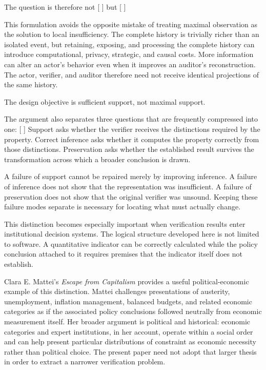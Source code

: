 \documentclass[11pt]{article}
\begin{document}
The question is therefore not
[
]
but
[
]

This formulation avoids the opposite mistake of treating maximal observation as the solution to local insufficiency. The complete history is trivially richer than an isolated event, but retaining, exposing, and processing the complete history can introduce computational, privacy, strategic, and causal costs. More information can alter an actor's behavior even when it improves an auditor's reconstruction. The actor, verifier, and auditor therefore need not receive identical projections of the same history.

The design objective is sufficient support, not maximal support.

The argument also separates three questions that are frequently compressed into one:
[
]
Support asks whether the verifier receives the distinctions required by the property. Correct inference asks whether it computes the property correctly from those distinctions. Preservation asks whether the established result survives the transformation across which a broader conclusion is drawn.

A failure of support cannot be repaired merely by improving inference. A failure of inference does not show that the representation was insufficient. A failure of preservation does not show that the original verifier was unsound. Keeping these failure modes separate is necessary for locating what must actually change.

This distinction becomes especially important when verification results enter institutional decision systems. The logical structure developed here is not limited to software. A quantitative indicator can be correctly calculated while the policy conclusion attached to it requires premises that the indicator itself does not establish.

Clara E. Mattei's \emph{Escape from Capitalism} provides a useful political-economic example of this distinction. Mattei challenges presentations of austerity, unemployment, inflation management, balanced budgets, and related economic categories as if the associated policy conclusions followed neutrally from economic measurement itself. Her broader argument is political and historical: economic categories and expert institutions, in her account, operate within a social order and can help present particular distributions of constraint as economic necessity rather than political choice. The present paper need not adopt that larger thesis in order to extract a narrower verification problem.
\end{document}
